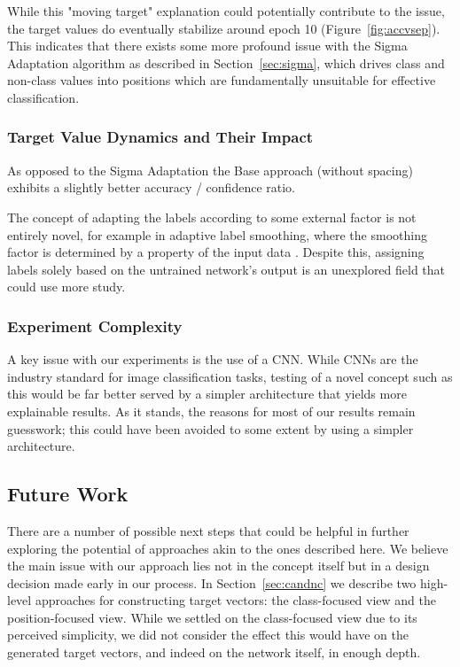 \documentclass[12pt,fleqn,a4paper]{article}
\begin{document}
While this "moving target" explanation could potentially contribute to the issue, the target values do eventually stabilize around epoch 10 (Figure~\ref{fig:accvsep}). This indicates that there exists some more profound issue with the Sigma Adaptation algorithm as described in Section~\ref{sec:sigma}, which drives class and non-class values into positions which are fundamentally unsuitable for effective classification.

\subsubsection{Target Value Dynamics and Their Impact}
As opposed to the Sigma Adaptation the Base approach (without spacing) exhibits a slightly better accuracy / confidence ratio.

The concept of adapting the labels according to some external factor is not entirely novel, for example in adaptive label smoothing, where the smoothing factor is determined by a property of the input data \cite{krothapalli_adaptive_2020}. Despite this, assigning labels solely based on the untrained network's output is an unexplored field that could use more study. 

\subsubsection{Experiment Complexity}
A key issue with our experiments is the use of a CNN. While CNNs are the industry standard for image classification tasks, testing of a novel concept such as this would be far better served by a simpler architecture that yields more explainable results. As it stands, the reasons for most of our results remain guesswork; this could have been avoided to some extent by using a simpler architecture.

\subsection{Future Work}
There are a number of possible next steps that could be helpful in further exploring the potential of approaches akin to the ones described here. We believe the main issue with our approach lies not in the concept itself but in a design decision made early in our process. In Section~\ref{sec:candnc} we describe two high-level approaches for constructing target vectors: the class-focused view and the position-focused view. While we settled on the class-focused view due to its perceived simplicity, we did not consider the effect this would have on the generated target vectors, and indeed on the network itself, in enough depth.\\
\end{document}
